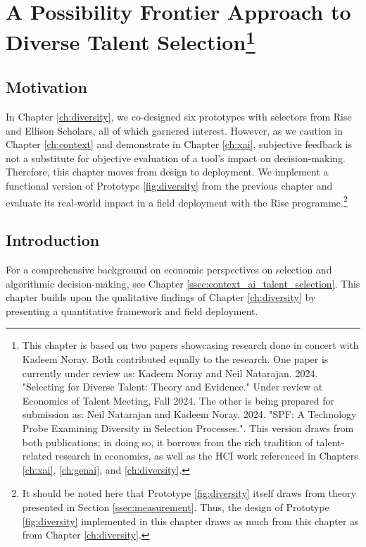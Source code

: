 \chapter[A Possibility Frontier Approach to Diverse Talent Selection]{\label{ch:spf}A Possibility Frontier Approach to Diverse Talent Selection\footnote{This chapter is based on two papers showcasing research done in concert with Kadeem Noray. Both contributed equally to the research. One paper is currently under review as: Kadeem Noray and Neil Natarajan. 2024. "Selecting for Diverse Talent: Theory and Evidence." Under review at Economics of Talent Meeting, Fall 2024. The other is being prepared for submission as: Neil Natarajan and Kadeem Noray. 2024. "SPF: A Technology Probe Examining Diversity in Selection Processes.". This version draws from both publications; in doing so, it borrows from the rich tradition of talent-related research in economics, as well as the HCI work referenced in Chapters \ref{ch:xai}, \ref{ch:genai}, and \ref{ch:diversity}.}}


\minitoc

\section{Motivation}
In Chapter \ref{ch:diversity}, we co-designed six prototypes with selectors from Rise and Ellison Scholars, all of which garnered interest. However, as we caution in Chapter \ref{ch:context} and demonstrate in Chapter \ref{ch:xai}, subjective feedback is not a substitute for objective evaluation of a tool's impact on decision-making. Therefore, this chapter moves from design to deployment. We implement a functional version of Prototype \ref{fig:diversity} from the previous chapter and evaluate its real-world impact in a field deployment with the Rise programme.\footnote{It should be noted here that Prototype \ref{fig:diversity} itself draws from theory presented in Section \ref{ssec:measurement}. Thus, the design of Prototype \ref{fig:diversity} implemented in this chapter draws as much from this chapter as from Chapter \ref{ch:diversity}.}

\section{Introduction}\label{sec:spfintro}
For a comprehensive background on economic perspectives on selection and algorithmic decision-making, see Chapter \ref{ssec:context_ai_talent_selection}. This chapter builds upon the qualitative findings of Chapter \ref{ch:diversity} by presenting a quantitative framework and field deployment.

